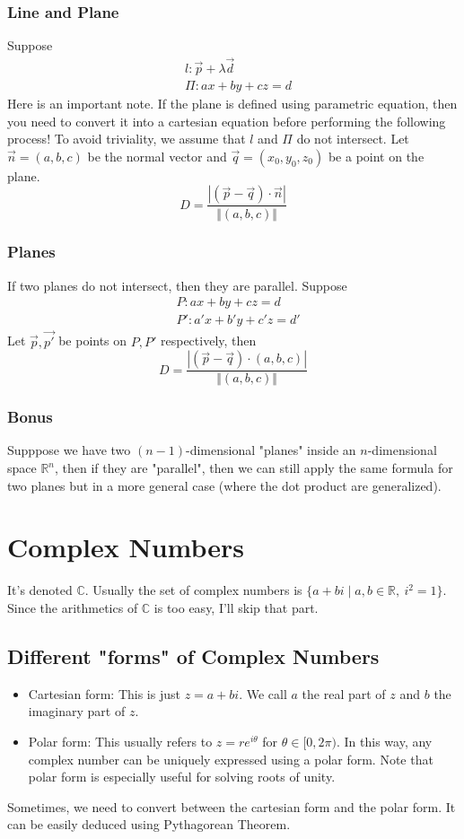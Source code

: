 \documentclass{article}
\theoremstyle{definition}
\theoremstyle{definition}
\theoremstyle{definition}
\theoremstyle{definition}
\theoremstyle{definition}
\theoremstyle{definition}
\theoremstyle{definition}
\theoremstyle{definition}
\theoremstyle{definition}
\newcommand{\RR}{\mathbb{R}}
\newcommand{\CC}{\mathbb{C}}
\begin{document}
\subsubsection{Line and Plane}
Suppose 
\begin{align*}
    &l:\vec{p}+\lambda\vec{d}\\
    &\Pi:ax+by+cz=d
\end{align*}
Here is an important note. If the plane is defined using parametric equation, then you need to convert it into a cartesian equation before performing the following process!
To avoid triviality, we assume that $l$ and $\Pi$ do not intersect. Let $\vec{n}=(a,b,c)$ be the normal vector and $\vec{q}=(x_0,y_0,z_0)$ be a point on the plane.
\[
D=\dfrac{|(\vec{p}-\vec{q})\cdot\vec{n}|}{\Vert(a,b,c)\Vert}
\] 
\subsubsection{Planes}
If two planes do not intersect, then they are parallel.
Suppose 
\begin{align*}
    &P:ax+by+cz=d\\
    &P':a'x+b'y+c'z=d'
\end{align*}
Let $\vec{p},\vec{p'}$ be points on $P,P'$ respectively, then
\[
D=\dfrac{|(\vec{p}-\vec{q})\cdot(a,b,c)|}{\Vert (a,b,c)\Vert}   
\]
\subsubsection{Bonus}
Supppose we have two $(n-1)$-dimensional "planes" inside an $n$-dimensional space $\RR^n$, then if they are "parallel", then we can still apply the same formula for two planes but in a more general case (where the dot product are generalized). 

\section{Complex Numbers}
It's denoted $\CC$. Usually the set of complex numbers is $\{a+bi\mid a,b\in\RR,\ i^2=1\}$. Since the arithmetics of $\CC$ is too easy,
I'll skip that part.
\subsection{Different "forms" of Complex Numbers}
\begin{itemize}
    \item Cartesian form: This is just $z=a+bi$. We call $a$ the real part of $z$ and $b$ the imaginary part of $z$.
    \item Polar form: This usually refers to $z=re^{i\theta}$ for $\theta\in[0,2\pi)$. In this way, any complex number can be uniquely expressed using a polar form. Note that polar form is especially useful for solving roots of unity.
\end{itemize}
Sometimes, we need to convert between the cartesian form and the polar form. It can be easily deduced using Pythagorean Theorem.
\end{document}
